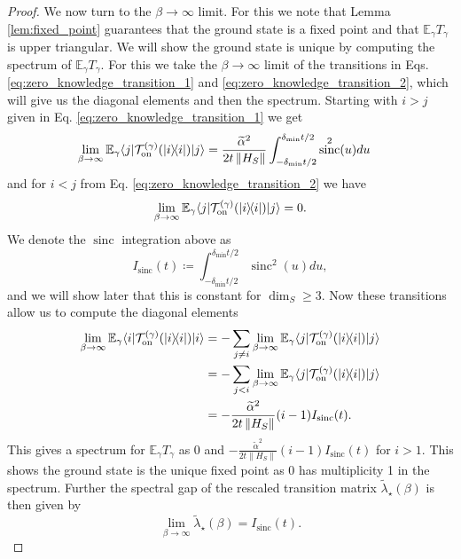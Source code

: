 \documentclass[
 amsmath,amssymb,
 aps,
onecolumn, 
nofootinbib]{revtex4-2}
\newcommand{\on}{\rm on}
\newcommand{\ket}[1]{|#1\rangle}
\newcommand{\bra}[1]{\langle #1|}
\newcommand{\ketbra}[2]{| #1\rangle\! \langle #2|}
\newcommand{\norm}[1]{\left\| #1 \right\|}
\newcommand{\EE}{\mathbb{E}}
\newcommand{\TT}{\mathcal{T}}
\DeclareMathOperator{\sinc}{sinc}
\begin{document}
\begin{proof}
    We now turn to the $\beta \to \infty$ limit. For this we note that Lemma \ref{lem:fixed_point} guarantees that the ground state is a fixed point and that $\EE_\gamma T_\gamma$ is upper triangular. We will show the ground state is unique by computing the spectrum of $\EE_\gamma T_\gamma$. For this we take the $\beta \to \infty$ limit of the transitions in Eqs. \eqref{eq:zero_knowledge_transition_1} and \eqref{eq:zero_knowledge_transition_2}, which will give us the diagonal elements and then the spectrum. Starting with $i > j$ given in Eq. \eqref{eq:zero_knowledge_transition_1} we get
    \begin{align}
        \lim_{\beta \to \infty} \EE_\gamma \bra{j} \TT_{\on}^{(\gamma)}(\ketbra{i}{i})\ket{j} &= \frac{\widetilde{\alpha}^2}{2 t \norm{H_S}} \int_{-\delta_{\min}t/2}^{\delta_{\min}t/2} \sinc^2(u) du
    \end{align}
    and for $i < j$ from Eq. \eqref{eq:zero_knowledge_transition_2} we have
    \begin{equation}
        \lim_{\beta \to \infty} \EE_\gamma \bra{j} \TT_{\on}^{(\gamma)}(\ketbra{i}{i})\ket{j} = 0.
    \end{equation}
    We denote the $\sinc$ integration above as
    \begin{equation}
        I_{\sinc}(t) \coloneqq \int_{-\delta_{\min}t/2}^{\delta_{\min} t/2} \sinc^2(u) du,
    \end{equation}
    and we will show later that this is constant for $\dim_S \ge 3$. Now these transitions allow us to compute the diagonal elements
    \begin{align}
        \lim_{\beta \to \infty} \EE_\gamma \bra{i} \TT_{\on}^{(\gamma)}(\ketbra{i}{i}) \ket{i} &= - \sum_{j \neq i} \lim_{\beta \to \infty} \EE_\gamma \bra{j} \TT_{\on}^{(\gamma)}(\ketbra{i}{i}) \ket{j} \\
        &= - \sum_{j < i} \lim_{\beta \to \infty} \EE_\gamma \bra{j} \TT_{\on}^{(\gamma)}(\ketbra{i}{i}) \ket{j} \\
        &= - \frac{\widetilde{\alpha}^2}{2 t \norm{H_S}} (i - 1) I_{\sinc}(t).
    \end{align}
    This gives a spectrum for $\EE_\gamma T_\gamma$ as 0 and $- \frac{\widetilde{\alpha}^2}{2 t \norm{H_S}} (i - 1) I_{\sinc}(t)$ for $i > 1$. This shows the ground state is the unique fixed point as 0 has multiplicity 1 in the spectrum. Further the spectral gap of the rescaled transition matrix $\widetilde{\lambda}_\star(\beta)$ is then given by
    \begin{equation}
        \lim_{\beta \to \infty} \widetilde{\lambda}_\star(\beta) = I_{\sinc}(t).

\end{equation}
\end{proof}
\end{document}
